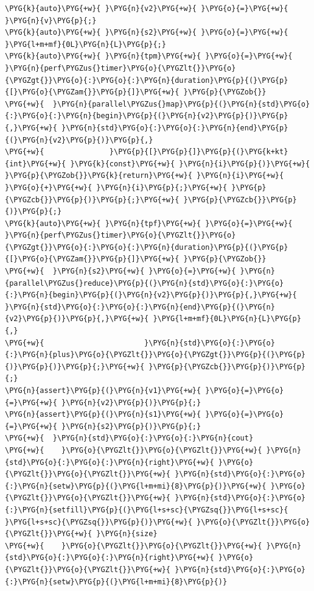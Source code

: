\begin{codeblockbg}
\begin{Verbatim}[commandchars=\\\{\},breaklines=true,breakanywhere=true,fontsize=\codefont,xleftmargin=17bp]
\PYG{k}{auto}\PYG{+w}{ }\PYG{n}{v2}\PYG{+w}{ }\PYG{o}{=}\PYG{+w}{ }\PYG{n}{v}\PYG{p}{;}
\PYG{k}{auto}\PYG{+w}{ }\PYG{n}{s2}\PYG{+w}{ }\PYG{o}{=}\PYG{+w}{ }\PYG{l+m+mf}{0L}\PYG{n}{L}\PYG{p}{;}
\PYG{k}{auto}\PYG{+w}{ }\PYG{n}{tpm}\PYG{+w}{ }\PYG{o}{=}\PYG{+w}{ }\PYG{n}{perf\PYGZus{}timer}\PYG{o}{\PYGZlt{}}\PYG{o}{\PYGZgt{}}\PYG{o}{:}\PYG{o}{:}\PYG{n}{duration}\PYG{p}{(}\PYG{p}{[}\PYG{o}{\PYGZam{}}\PYG{p}{]}\PYG{+w}{ }\PYG{p}{\PYGZob{}}
\PYG{+w}{  }\PYG{n}{parallel\PYGZus{}map}\PYG{p}{(}\PYG{n}{std}\PYG{o}{:}\PYG{o}{:}\PYG{n}{begin}\PYG{p}{(}\PYG{n}{v2}\PYG{p}{)}\PYG{p}{,}\PYG{+w}{ }\PYG{n}{std}\PYG{o}{:}\PYG{o}{:}\PYG{n}{end}\PYG{p}{(}\PYG{n}{v2}\PYG{p}{)}\PYG{p}{,}
\PYG{+w}{               }\PYG{p}{[}\PYG{p}{]}\PYG{p}{(}\PYG{k+kt}{int}\PYG{+w}{ }\PYG{k}{const}\PYG{+w}{ }\PYG{n}{i}\PYG{p}{)}\PYG{+w}{ }\PYG{p}{\PYGZob{}}\PYG{k}{return}\PYG{+w}{ }\PYG{n}{i}\PYG{+w}{ }\PYG{o}{+}\PYG{+w}{ }\PYG{n}{i}\PYG{p}{;}\PYG{+w}{ }\PYG{p}{\PYGZcb{}}\PYG{p}{)}\PYG{p}{;}\PYG{+w}{ }\PYG{p}{\PYGZcb{}}\PYG{p}{)}\PYG{p}{;}
\PYG{k}{auto}\PYG{+w}{ }\PYG{n}{tpf}\PYG{+w}{ }\PYG{o}{=}\PYG{+w}{ }\PYG{n}{perf\PYGZus{}timer}\PYG{o}{\PYGZlt{}}\PYG{o}{\PYGZgt{}}\PYG{o}{:}\PYG{o}{:}\PYG{n}{duration}\PYG{p}{(}\PYG{p}{[}\PYG{o}{\PYGZam{}}\PYG{p}{]}\PYG{+w}{ }\PYG{p}{\PYGZob{}}
\PYG{+w}{  }\PYG{n}{s2}\PYG{+w}{ }\PYG{o}{=}\PYG{+w}{ }\PYG{n}{parallel\PYGZus{}reduce}\PYG{p}{(}\PYG{n}{std}\PYG{o}{:}\PYG{o}{:}\PYG{n}{begin}\PYG{p}{(}\PYG{n}{v2}\PYG{p}{)}\PYG{p}{,}\PYG{+w}{ }\PYG{n}{std}\PYG{o}{:}\PYG{o}{:}\PYG{n}{end}\PYG{p}{(}\PYG{n}{v2}\PYG{p}{)}\PYG{p}{,}\PYG{+w}{ }\PYG{l+m+mf}{0L}\PYG{n}{L}\PYG{p}{,}
\PYG{+w}{                       }\PYG{n}{std}\PYG{o}{:}\PYG{o}{:}\PYG{n}{plus}\PYG{o}{\PYGZlt{}}\PYG{o}{\PYGZgt{}}\PYG{p}{(}\PYG{p}{)}\PYG{p}{)}\PYG{p}{;}\PYG{+w}{ }\PYG{p}{\PYGZcb{}}\PYG{p}{)}\PYG{p}{;}
\PYG{n}{assert}\PYG{p}{(}\PYG{n}{v1}\PYG{+w}{ }\PYG{o}{=}\PYG{o}{=}\PYG{+w}{ }\PYG{n}{v2}\PYG{p}{)}\PYG{p}{;}
\PYG{n}{assert}\PYG{p}{(}\PYG{n}{s1}\PYG{+w}{ }\PYG{o}{=}\PYG{o}{=}\PYG{+w}{ }\PYG{n}{s2}\PYG{p}{)}\PYG{p}{;}
\PYG{+w}{  }\PYG{n}{std}\PYG{o}{:}\PYG{o}{:}\PYG{n}{cout}
\PYG{+w}{    }\PYG{o}{\PYGZlt{}}\PYG{o}{\PYGZlt{}}\PYG{+w}{ }\PYG{n}{std}\PYG{o}{:}\PYG{o}{:}\PYG{n}{right}\PYG{+w}{ }\PYG{o}{\PYGZlt{}}\PYG{o}{\PYGZlt{}}\PYG{+w}{ }\PYG{n}{std}\PYG{o}{:}\PYG{o}{:}\PYG{n}{setw}\PYG{p}{(}\PYG{l+m+mi}{8}\PYG{p}{)}\PYG{+w}{ }\PYG{o}{\PYGZlt{}}\PYG{o}{\PYGZlt{}}\PYG{+w}{ }\PYG{n}{std}\PYG{o}{:}\PYG{o}{:}\PYG{n}{setfill}\PYG{p}{(}\PYG{l+s+sc}{\PYGZsq{}}\PYG{l+s+sc}{ }\PYG{l+s+sc}{\PYGZsq{}}\PYG{p}{)}\PYG{+w}{ }\PYG{o}{\PYGZlt{}}\PYG{o}{\PYGZlt{}}\PYG{+w}{ }\PYG{n}{size}
\PYG{+w}{    }\PYG{o}{\PYGZlt{}}\PYG{o}{\PYGZlt{}}\PYG{+w}{ }\PYG{n}{std}\PYG{o}{:}\PYG{o}{:}\PYG{n}{right}\PYG{+w}{ }\PYG{o}{\PYGZlt{}}\PYG{o}{\PYGZlt{}}\PYG{+w}{ }\PYG{n}{std}\PYG{o}{:}\PYG{o}{:}\PYG{n}{setw}\PYG{p}{(}\PYG{l+m+mi}{8}\PYG{p}{)}

\end{Verbatim}
\end{codeblockbg}
